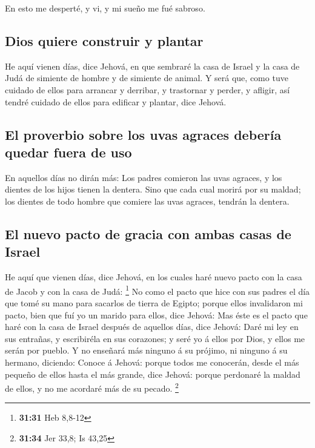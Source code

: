  En esto me desperté, y vi, y mi sueño me fué sabroso.

\hypertarget{dios-quiere-construir-y-plantar}{%
\subsection{Dios quiere construir y
plantar}\label{dios-quiere-construir-y-plantar}}

 He aquí vienen días, dice Jehová, en que sembraré la
casa de Israel y la casa de Judá de simiente de hombre y de simiente de
animal.  Y será que, como tuve cuidado de ellos para
arrancar y derribar, y trastornar y perder, y afligir, así tendré
cuidado de ellos para edificar y plantar, dice Jehová.

\hypertarget{el-proverbio-sobre-los-uvas-agraces-deberuxeda-quedar-fuera-de-uso}{%
\subsection{El proverbio sobre los uvas agraces debería quedar fuera de
uso}\label{el-proverbio-sobre-los-uvas-agraces-deberuxeda-quedar-fuera-de-uso}}

 En aquellos días no dirán más: Los padres comieron las
uvas agraces, y los dientes de los hijos tienen la dentera.
 Sino que cada cual morirá por su maldad; los dientes de
todo hombre que comiere las uvas agraces, tendrán la dentera.

\hypertarget{el-nuevo-pacto-de-gracia-con-ambas-casas-de-israel}{%
\subsection{El nuevo pacto de gracia con ambas casas de
Israel}\label{el-nuevo-pacto-de-gracia-con-ambas-casas-de-israel}}

 He aquí que vienen días, dice Jehová, en los cuales haré
nuevo pacto con la casa de Jacob y con la casa de Judá: \footnote{\textbf{31:31}
  Heb 8,8-12}  No como el pacto que hice con sus padres
el día que tomé su mano para sacarlos de tierra de Egipto; porque ellos
invalidaron mi pacto, bien que fuí yo un marido para ellos, dice Jehová:
 Mas éste es el pacto que haré con la casa de Israel
después de aquellos días, dice Jehová: Daré mi ley en sus entrañas, y
escribiréla en sus corazones; y seré yo á ellos por Dios, y ellos me
serán por pueblo.  Y no enseñará más ninguno á su
prójimo, ni ninguno á su hermano, diciendo: Conoce á Jehová: porque
todos me conocerán, desde el más pequeño de ellos hasta el más grande,
dice Jehová: porque perdonaré la maldad de ellos, y no me acordaré más
de su pecado. \footnote{\textbf{31:34} Jer 33,8; Is 43,25}

